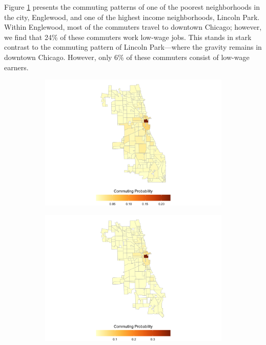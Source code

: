 \documentclass[12pt]{article}
\begin{document}
Figure \ref{fig:englewood_lincoln} presents the commuting patterns of one of the poorest neighborhoods in the city, Englewood, and one of the highest income neighborhoods, Lincoln Park. Within Englewood, most of the commuters travel to downtown Chicago; however, we find that 24\% of these commuters work low-wage jobs. This stands in stark contrast to the commuting pattern of Lincoln Park---where the gravity remains in downtown Chicago. However, only 6\% of these commuters consist of low-wage earners. 
\begin{figure}[h!]
\centering
    \caption{Englewood versus Lincoln Park}
    \begin{subfigure}{0.49\textwidth}
         \centering
         \includegraphics[width=\textwidth]{Pset1/code/lodes_diagnostics_files/figure-html/unnamed-chunk-14-1.png}
    \end{subfigure}  
    \begin{subfigure}{0.49\textwidth}
         \centering
         \includegraphics[width=\linewidth]{Pset1/code/lodes_diagnostics_files/figure-html/unnamed-chunk-17-1.png}
    \end{subfigure}
    \label{fig:englewood_lincoln}
\end{figure}
\end{document}

